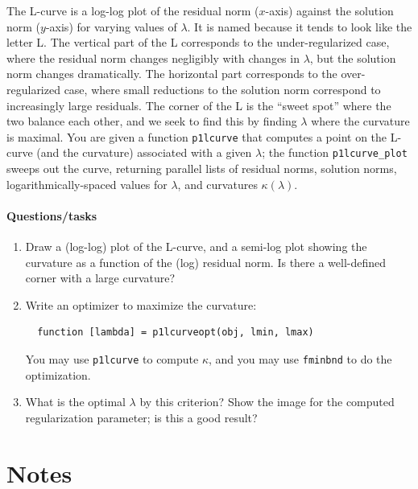 \documentclass[12pt, leqno]{article} %
\begin{document}
The L-curve is a log-log plot of the residual norm ($x$-axis) against
the solution norm ($y$-axis) for varying values of $\lambda$.  It is
named because it tends to look like the letter L.  The vertical part of the L
corresponds to the under-regularized case, where the residual norm
changes negligibly with changes in $\lambda$, but the solution norm
changes dramatically.  The horizontal part corresponds to the
over-regularized case, where small reductions to the solution norm
correspond to increasingly large residuals.  The corner of the L is
the ``sweet spot'' where the two balance each other, and we seek to
find this by finding $\lambda$ where the curvature is maximal.
You are given a function {\tt p1lcurve} that computes a point on the
L-curve (and the curvature) associated with a given $\lambda$;
the function {\tt p1lcurve\_plot} sweeps out the curve, returning
parallel lists of residual norms, solution norms,
logarithmically-spaced values for $\lambda$, and
curvatures $\kappa(\lambda)$.

\paragraph*{Questions/tasks}
\begin{enumerate}
\item
  Draw a (log-log) plot of the L-curve, and a semi-log plot showing
  the curvature as a function of the (log) residual norm.  Is there
  a well-defined corner with a large curvature?
\item
  Write an optimizer to maximize the curvature:
\begin{lstlisting}
  function [lambda] = p1lcurveopt(obj, lmin, lmax)
\end{lstlisting}
  You may use {\tt p1lcurve} to compute $\kappa$, and you may
  use {\tt fminbnd} to do the optimization.
\item
  What is the optimal $\lambda$ by this criterion?
  Show the image for the computed regularization parameter;
  is this a good result?
\end{enumerate}

\section{Notes}
\end{document}
